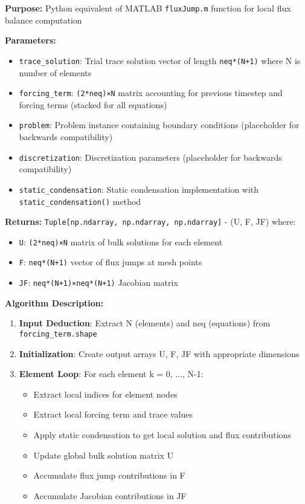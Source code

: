 \textbf{Purpose:} Python equivalent of MATLAB \texttt{fluxJump.m} function for local flux balance computation

\textbf{Parameters:}
\begin{itemize}
    \item \texttt{trace\_solution}: Trial trace solution vector of length \texttt{neq*(N+1)} where N is number of elements
    \item \texttt{forcing\_term}: \texttt{(2*neq)×N} matrix accounting for previous timestep and forcing terms (stacked for all equations)
    \item \texttt{problem}: Problem instance containing boundary conditions (placeholder for backwards compatibility)
    \item \texttt{discretization}: Discretization parameters (placeholder for backwards compatibility)
    \item \texttt{static\_condensation}: Static condensation implementation with \texttt{static\_condensation()} method
\end{itemize}

\textbf{Returns:} \texttt{Tuple[np.ndarray, np.ndarray, np.ndarray]} - (U, F, JF) where:
\begin{itemize}
    \item \texttt{U}: \texttt{(2*neq)×N} matrix of bulk solutions for each element
    \item \texttt{F}: \texttt{neq*(N+1)} vector of flux jumps at mesh points
    \item \texttt{JF}: \texttt{neq*(N+1)×neq*(N+1)} Jacobian matrix
\end{itemize}

\textbf{Algorithm Description:}
\begin{enumerate}
    \item \textbf{Input Deduction}: Extract N (elements) and neq (equations) from \texttt{forcing\_term.shape}
    \item \textbf{Initialization}: Create output arrays U, F, JF with appropriate dimensions
    \item \textbf{Element Loop}: For each element k = 0, ..., N-1:
    \begin{itemize}
        \item Extract local indices for element nodes
        \item Extract local forcing term and trace values
        \item Apply static condensation to get local solution and flux contributions
        \item Update global bulk solution matrix U
        \item Accumulate flux jump contributions in F
        \item Accumulate Jacobian contributions in JF
    \end{itemize}
\end{enumerate}

